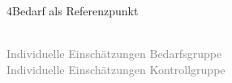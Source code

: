 \documentclass[xcolor=table,9pt,aspectratio=169]{beamer}
\begin{document}
\begin{frame}{\vspace*{10mm}4\hspace*{1em}Bedarf als Referenzpunkt}
\begin{multicols}{2}
   \begin{center}
      \\
      \textcolor{gray}{Individuelle Einschätzungen Bedarfsgruppe}
      \\
      \textcolor{gray}{Individuelle Einschätzungen Kontrollgruppe}
   \end{center}
\end{multicols}
\end{frame}
\end{document}
